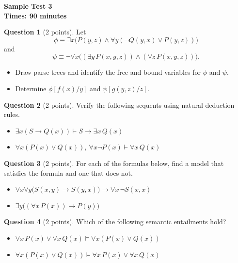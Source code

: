 \documentclass[12pt]{article}
\begin{document}
\begin{center}
    \textbf{Sample Test 3} \\
    \textbf{Times: 90 minutes}
\end{center}

\vspace{0.3cm}

\noindent\textbf{Question 1} (2 points). Let
\[
\phi \equiv \exists x \bigl( P(y, z) \wedge \forall y (\neg Q(y, x) \vee P(y, z)) \bigr)
\]
and
\[
\psi \equiv \neg \forall x \bigl( (\exists y\, P(x, y, z)) \wedge (\forall z\, P(x, y, z)) \bigr).
\]
\begin{itemize}
    \item[a)] Draw parse trees and identify the free and bound variables for $\phi$ and $\psi$.
    \item[b)] Determine $\phi[f(x)/y]$ and $\psi[g(y, z)/z]$.
\end{itemize}

\vspace{0.2cm}

\noindent\textbf{Question 2} (2 points). Verify the following sequents using natural deduction rules.
\begin{itemize}
    \item[a)] $\exists x (S \rightarrow Q(x)) \vdash S \rightarrow \exists x\, Q(x)$
    \item[b)] $\forall x (P(x) \vee Q(x)),\ \forall x \neg P(x) \vdash \forall x\, Q(x)$
\end{itemize}

\vspace{0.2cm}

\noindent\textbf{Question 3} (2 points). For each of the formulas below, find a model that satisfies the formula and one that does not.
\begin{itemize}
    \item[a)] $\forall x \forall y \bigl( S(x, y) \rightarrow S(y, x) \bigr) \rightarrow \forall x\, \neg S(x, x)$
    \item[b)] $\exists y \bigl( (\forall x\, P(x)) \rightarrow P(y) \bigr)$
\end{itemize}

\vspace{0.2cm}

\noindent\textbf{Question 4} (2 points). Which of the following semantic entailments hold?
\begin{itemize}
    \item[a)] $\forall x\, P(x) \vee \forall x\, Q(x) \models \forall x (P(x) \vee Q(x))$
    \item[b)] $\forall x (P(x) \vee Q(x)) \models \forall x\, P(x) \vee \forall x\, Q(x)$
\end{itemize}
\end{document}
